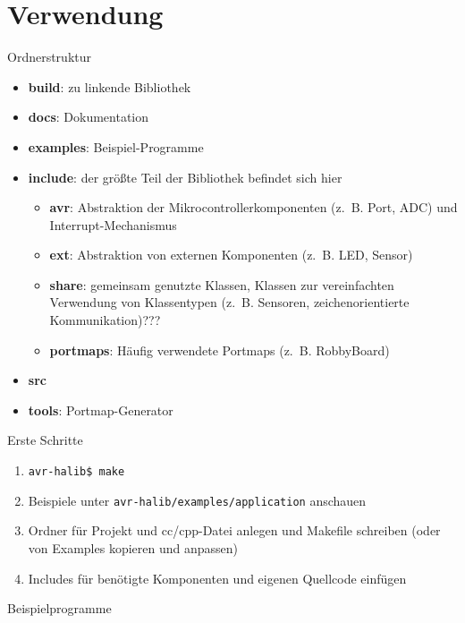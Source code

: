 \documentclass[11pt]{beamer}
\begin{document}
\section{Verwendung}


\begin{frame}{Ordnerstruktur}

\begin{small}\begin{itemize}
	\item \textbf{build}: zu linkende Bibliothek
 	\item \textbf{docs}: Dokumentation
	\item \textbf{examples}: Beispiel-Programme
	\item \textbf{include}: der größte Teil der Bibliothek befindet sich hier 
	\begin{itemize}
		\item \textbf{avr}: Abstraktion der Mikrocontrollerkomponenten (z.~B. Port, ADC) und Interrupt-Mechanismus
		\item \textbf{ext}: Abstraktion von externen Komponenten (z.~B. LED, Sensor)
		\item \textbf{share}: gemeinsam genutzte Klassen, Klassen zur vereinfachten Verwendung von Klassentypen (z.~B. Sensoren, zeichenorientierte Kommunikation)???
		\item \textbf{portmaps}: Häufig verwendete Portmaps (z.~B. RobbyBoard)
	\end{itemize}
	\item \textbf{src}
	\item \textbf{tools}: Portmap-Generator
\end{itemize}
\end{small}\end{frame}


\begin{frame}[fragile]{Erste Schritte}
\begin{enumerate}
	\item \verb!avr-halib$ make!
	\item Beispiele unter \verb!avr-halib/examples/application! anschauen
	\item Ordner für Projekt und cc/cpp-Datei anlegen und Makefile schreiben (oder von Examples kopieren und anpassen)
	\item Includes für benötigte Komponenten und eigenen Quellcode einfügen
\end{enumerate}
\end{frame}


\begin{frame}[fragile]{Beispielprogramme}
~~
\end{frame}
\end{document}
